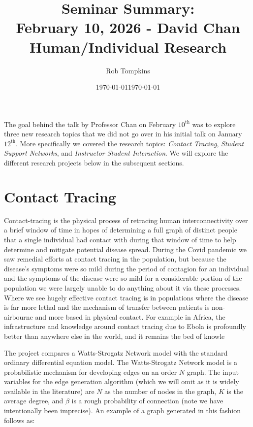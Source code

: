 \documentclass[12pt]{amsart}
\title{Seminar Summary:\\February 10, 2026 - David Chan\\Human/Individual Research}
\author{Rob Tompkins}
\date{\today}
\theoremstyle{definition}
\begin{document}
    \maketitle
    \date{\today}
    \begin{onehalfspace}
        The goal behind the talk by Professor Chan on February $10^{\text{th}}$ was to explore three new research
        topics that we did not go over in his initial talk on January $12^{\text{th}}$.
        More specifically we covered the research topics: \emph{Contact Tracing}, \emph{Student Support Networks}, and
        \emph{Instructor Student Interaction}. We will explore the different research projects below in the subsequent
        sections.

        \section{Contact Tracing}
        Contact-tracing is the physical process of retracing human interconnectivity over a brief window of time in hopes
        of determining a full graph of distinct people that a single individual had contact with during that window of time
        to help determine and mitigate potential disease spread.
        During the Covid pandemic we saw remedial efforts at contact tracing in the population, but because the
        disease's symptoms were so mild during the period of contagion for an individual and the symptoms of the
        disease were so mild for a considerable portion of the population we were largely unable to do anything about
        it via these processes.
        Where we see hugely effective contact tracing is in populations where the disease is far more lethal and the
        mechanism of transfer between patients is non-airbourne and more based in physical contact.
        For example in Africa, the infrastructure and knowledge around contact tracing due to Ebola is profoundly better
        than anywhere else in the world, and it remains the bed of knowle

        The project compares a Watts-Strogatz Network model with the standard ordinary differential equation model.
        The Watts-Strogatz Network model is a probabilistic mechanism for developing edges on an order $N$ graph.
        The input variables for the edge generation algorithm (which we will omit as it is widely available in the
        literature) are $N$ as the number of nodes in the graph, $K$ is the average degree, and $\beta$ is a
        rough probability of connection (note we have intentionally been imprecise).
        An example of a graph generated in this fashion follows as:


\end{onehalfspace}
\end{document}
